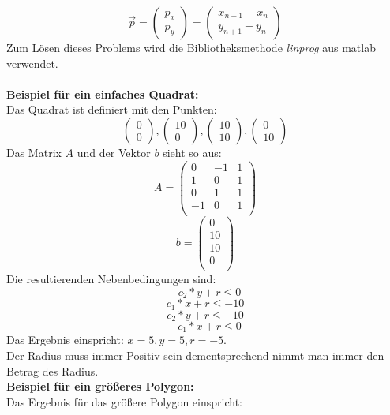 \documentclass[conference]{IEEEtran}
\begin{document}
	\[ \vec{p} =  \left(\begin{array}{c}p_x\\p_y\end{array}\right) = \left(\begin{array}{c}x_{n+1} - x_n\\y_{n+1} - y_n\end{array}\right) \]
	Zum Lösen dieses Problems wird die Bibliotheksmethode \textit{linprog} aus matlab verwendet.\\
	\\
	\textbf{Beispiel für ein einfaches Quadrat:}\\
	Das Quadrat ist definiert mit den Punkten:
	\[\left(\begin{array}{c}0\\0\end{array}\right) , \left(\begin{array}{c}10\\0\end{array}\right),\left(\begin{array}{c}10\\10\end{array}\right),\left(\begin{array}{c}0\\10\end{array}\right)\]
	Das Matrix $A$ und der Vektor $b$ sieht so aus:
	\[A = \begin{pmatrix}
		0 & -1 & 1 \\
		1 & 0 & 1 \\
		0 & 1 & 1 \\
		-1 & 0 & 1 \\
	\end{pmatrix}\]
	\[b = \begin{pmatrix}
		0 \\
		10\\
		10\\
		0\\
	\end{pmatrix}\]
	Die resultierenden Nebenbedingungen sind:
	\[ -c_2*y+r \leq 0 \]
	\[ c_1*x+r \leq -10 \]
	\[ c_2*y+r \leq -10 \]
	\[ -c_1*x+r \leq 0 \]
	 Das Ergebnis einspricht: $x = 5, y = 5, r = -5$.\\
	 Der Radius muss immer Positiv sein dementsprechend nimmt man immer den Betrag des Radius.\\
	\textbf{Beispiel für ein größeres Polygon:}\\
	Das Ergebnis für das größere Polygon einspricht:\\
\end{document}
